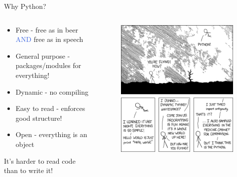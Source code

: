 \documentclass[11pt,professionalfonts]{beamer}
\def\Emph{\textcolor{RoyalBlue}}
\begin{document}
\begin{frame}{Why Python?}
    \begin{columns}
    \begin{column}{0.5\textwidth}
    \begin{itemize}
        \item Free - free as in beer \Emph{AND} free as in speech
        \item General purpose - packages/modules for everything!
        \item Dynamic - no compiling
        \item Easy to read - enforces good structure!
        \item Open - everything is an object
    \end{itemize}
    \pause
    \begin{block}{}
        It's harder to read code than to write it!
    \end{block}
    \end{column}
    \begin{column}{0.5\textwidth}
        \begin{figure}
            \centering
            \includegraphics[width=\columnwidth,height=0.8\textheight,keepaspectratio]{figures/python.png}
        \end{figure}
    \end{column}
    \end{columns}
\end{frame}
\end{document}

